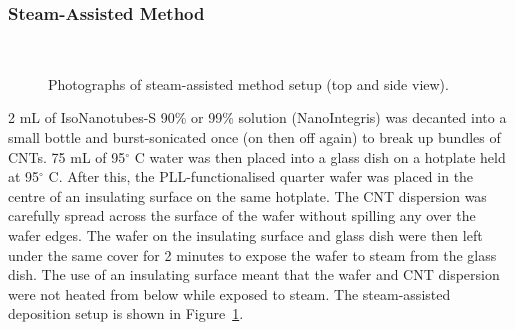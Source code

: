 \documentclass[
  a4paper,
]{scrbook}
\begin{document}
\hypertarget{steam-assisted-method}{%
\subsubsection*{Steam-Assisted Method}\label{steam-assisted-method}}

\begin{figure}

\begin{minipage}[t]{0.47\linewidth}

{\centering 


}

\end{minipage}%
%
\begin{minipage}[t]{0.05\linewidth}

{\centering 

~

}

\end{minipage}%
%
\begin{minipage}[t]{0.47\linewidth}

{\centering 


}

\end{minipage}%

\caption{\label{fig-steaming-method}Photographs of steam-assisted method
setup (top and side view).}

\end{figure}

2 mL of IsoNanotubes-S 90\% or 99\% solution (NanoIntegris) was decanted
into a small bottle and burst-sonicated once (on then off again) to
break up bundles of CNTs. 75 mL of 95\(^\circ\) C water was then placed
into a glass dish on a hotplate held at 95\(^\circ\) C. After this, the
PLL-functionalised quarter wafer was placed in the centre of an
insulating surface on the same hotplate. The CNT dispersion was
carefully spread across the surface of the wafer without spilling any
over the wafer edges. The wafer on the insulating surface and glass dish
were then left under the same cover for 2 minutes to expose the wafer to
steam from the glass dish. The use of an insulating surface meant that
the wafer and CNT dispersion were not heated from below while exposed to
steam. The steam-assisted deposition setup is shown in
Figure~\ref{fig-steaming-method}.
\end{document}
